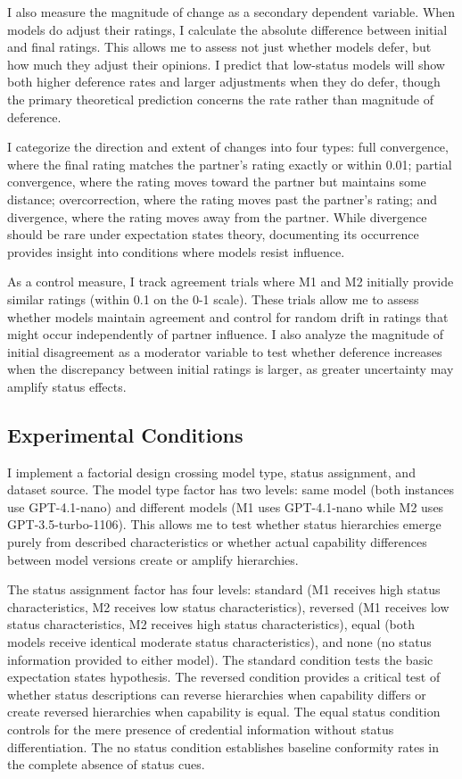 I also measure the magnitude of change as a secondary dependent variable. When models do adjust their ratings, I calculate the absolute difference between initial and final ratings. This allows me to assess not just whether models defer, but how much they adjust their opinions. I predict that low-status models will show both higher deference rates and larger adjustments when they do defer, though the primary theoretical prediction concerns the rate rather than magnitude of deference.

I categorize the direction and extent of changes into four types: full convergence, where the final rating matches the partner's rating exactly or within 0.01; partial convergence, where the rating moves toward the partner but maintains some distance; overcorrection, where the rating moves past the partner's rating; and divergence, where the rating moves away from the partner. While divergence should be rare under expectation states theory, documenting its occurrence provides insight into conditions where models resist influence.

As a control measure, I track agreement trials where M1 and M2 initially provide similar ratings (within 0.1 on the 0-1 scale). These trials allow me to assess whether models maintain agreement and control for random drift in ratings that might occur independently of partner influence. I also analyze the magnitude of initial disagreement as a moderator variable to test whether deference increases when the discrepancy between initial ratings is larger, as greater uncertainty may amplify status effects.

\subsection{Experimental Conditions}

I implement a factorial design crossing model type, status assignment, and dataset source. The model type factor has two levels: same model (both instances use GPT-4.1-nano) and different models (M1 uses GPT-4.1-nano while M2 uses GPT-3.5-turbo-1106). This allows me to test whether status hierarchies emerge purely from described characteristics or whether actual capability differences between model versions create or amplify hierarchies.

The status assignment factor has four levels: standard (M1 receives high status characteristics, M2 receives low status characteristics), reversed (M1 receives low status characteristics, M2 receives high status characteristics), equal (both models receive identical moderate status characteristics), and none (no status information provided to either model). The standard condition tests the basic expectation states hypothesis. The reversed condition provides a critical test of whether status descriptions can reverse hierarchies when capability differs or create reversed hierarchies when capability is equal. The equal status condition controls for the mere presence of credential information without status differentiation. The no status condition establishes baseline conformity rates in the complete absence of status cues.

